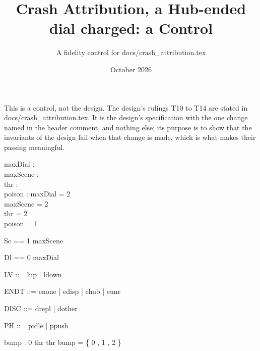 \documentclass[a4paper,10pt,fleqn]{article}
\begin{document}
\title{Crash Attribution, a Hub-ended dial charged: a Control}
\author{A fidelity control for docs/crash\_attribution.tex}
\date{October 2026}
\maketitle

This is a control, not the design.  The design's rulings T10 to T14 are stated in docs/crash_attribution.tex.  It is the design's
specification with the one change named in the header comment, and nothing
else; its purpose is to show that the invariants of the design fail when
that change is made, which is what makes their passing meaningful.

\begin{axdef}
  maxDial : \nat \\
  maxScene : \nat \\
  thr : \nat \\
  poison : \nat
\where
  maxDial = 2 \\
  maxScene = 2 \\
  thr = 2 \\
  poison = 1
\end{axdef}

\begin{zed}
  Sc == 1 \upto maxScene
\end{zed}

\begin{zed}
  Dl == 0 \upto maxDial
\end{zed}

\begin{zed}
  LV ::= lup | ldown
\end{zed}

\begin{zed}
  ENDT ::= enone | edisp | ehub | eunr
\end{zed}

\begin{zed}
  DISC ::= drepl | dother
\end{zed}

\begin{zed}
  PH ::= pidle | ppush
\end{zed}

\begin{axdef}
  bump : 0 \upto thr  \upto thr
\where
  bump = \{ 0 , 1 , 2  \}
\end{axdef}
\end{document}
